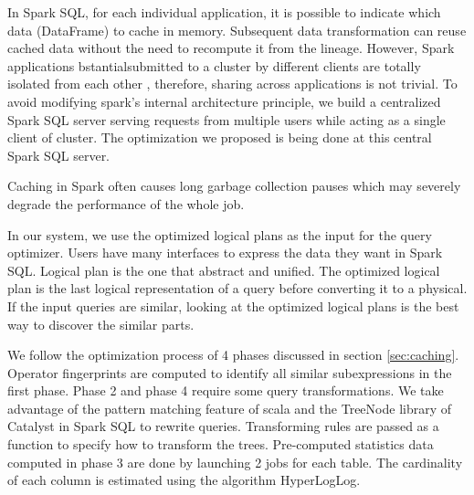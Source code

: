 In Spark SQL, for each individual application, it is possible to indicate which data (DataFrame) to cache in memory. Subsequent data transformation can reuse cached data without the need to recompute it from the lineage. However, Spark applications bstantialsubmitted to a cluster by different clients are totally isolated from each other \cite{zaharia2012resilient}, therefore, sharing across applications is not trivial. To avoid modifying spark's internal architecture principle, we build a centralized Spark SQL server serving requests from multiple users while acting as a single client of cluster. The optimization we proposed is being done at this central Spark SQL server.

Caching in Spark often causes long garbage collection pauses which may severely degrade the performance of the whole job.


In our system, we use the optimized logical plans as the input for the query optimizer. Users have many interfaces to express the data they want in Spark SQL. Logical plan is the one that abstract and unified. The optimized logical plan is the last logical representation of a query before converting it to a physical. If the input queries are similar, looking at the optimized logical plans is the best way to discover the similar parts.

We follow the optimization process of 4 phases discussed in section \ref{sec:caching}. Operator fingerprints are computed to identify all similar subexpressions in the first phase. Phase 2 and phase 4 require some query transformations. We take advantage of the pattern matching feature of scala and the TreeNode library of Catalyst in Spark SQL to rewrite queries. Transforming rules are passed as a function to specify how to transform the trees. Pre-computed statistics data computed in phase 3 are done by launching 2 jobs for each table. The cardinality of each column is estimated using the algorithm HyperLogLog.